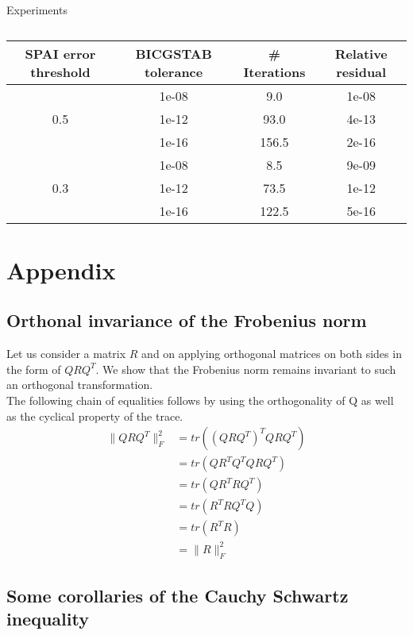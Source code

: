 \documentclass[paper=A4, fontsize=11pt]{scrartcl}
\theoremstyle{remark}
\begin{document}
\begin{section}{Experiments}
\begin{table}[]
	\centering
	\begin{tabular}{@{}cccc@{}}
		\toprule
		SPAI error threshold & BICGSTAB tolerance & \# Iterations & Relative residual  \\ \midrule
		\multirow{3}{*}{0.5}& 1e-08 & 9.0 & 1e-08 \\
			& 1e-12 & 93.0 & 4e-13 \\
			& 1e-16 & 156.5 & 2e-16 \\
		\midrule
		\multirow{3}{*}{0.3} & 1e-08	& 8.5	& 9e-09 \\
		& 1e-12	& 73.5	& 1e-12 \\
		& 1e-16	& 122.5	& 5e-16 \\
		\bottomrule
	\end{tabular}
	\caption{}
	\label{tab:benzi}
\end{table}

\end{section}
\clearpage
\section{Appendix}

\subsection{Orthonal invariance of the Frobenius norm}\label{sec:ortho}
Let us consider a matrix $R$ and on applying orthogonal matrices on both sides in the form of $QRQ^{T}$. We show that the Frobenius norm remains invariant to such an orthogonal transformation. \\

The following chain of equalities follows by using the orthogonality of
Q as well as the cyclical property of the trace.
\begin{equation}
\begin{aligned}
\|QRQ^{T} \|_{F}^{2}
& =  tr((QRQ^{T})^{T}QRQ^{T}) \\
& =  tr(QR^{T}Q^{T}QRQ^{T}) \\
& =  tr(QR^{T}RQ^{T}) \\
& =  tr(R^{T}RQ^{T}Q) \\
& =  tr(R^{T}R) \\
& =  \|R\|_{F}^{2} 
\end{aligned}
\end{equation}
	
\subsection{Some corollaries of the Cauchy Schwartz inequality} \label{sec:csi}
\end{document}
